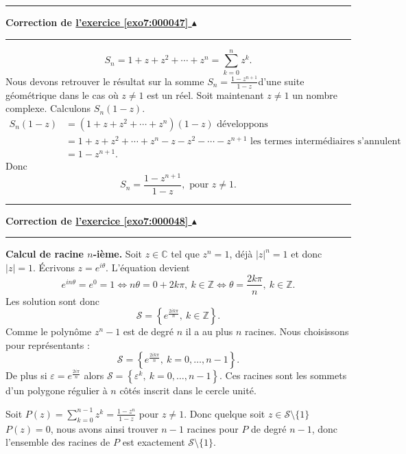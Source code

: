 \documentclass[11pt,a4paper]{article}
\newcommand{\Zz}{\mathbb{Z}} \newcommand{\Z}{\mathbb{Z}}
\newcommand{\Cc}{\mathbb{C}} \newcommand{\C}{\mathbb{C}}
\renewcommand{\epsilon}{\varepsilon}
\newcounter{exo}
\newcommand{\correction}[1]{\hypertarget{cor7:#1}{}\label{cor7:#1}{\bf Correction de \hyperlink{exo7:#1}{l'exercice \ref{exo7:#1} $\blacktriangle$}}\vspace{1mm}\hrule\vspace{1mm}}
\newcommand{\fincorrection}{\vspace{1mm}\hrule\vspace*{7mm}}
\begin{document}
\fincorrection
\correction{000047}
$$S_n = 1+z+z^2+\cdots+z^n = \sum_{k=0}^{n}z^k.$$
Nous devons retrouver le r\'esultat sur la somme $S_n =
\frac{1-z^{n+1}}{1-z}$d'une suite g\'eom\'etrique dans le cas o\`u
$z\not=1$ est un r\'eel. Soit maintenant $z \not= 1$ un nombre
complexe. Calculons $S_n(1-z)$.
\begin{align*}
S_n(1-z) & =(1+z+z^2+\cdots+z^n)(1-z) \text{ d\'eveloppons }\\
         &= 1+z+z^2+\cdots+z^n - z-z^2-\cdots-z^{n+1} \text{ les termes interm\'ediaires s'annulent }\\
         &= 1-z^{n+1}.
\end{align*}
Donc $$S_n = \frac{1-z^{n+1}}{1-z}, \text{ pour } z\not= 1.$$
\fincorrection
\correction{000048}
\textbf{Calcul de racine $n$-i\`eme.} Soit $z\in\Cc$ tel que
$z^n=1$, d\'ej\`a $|z|^n=1$ et donc $|z|=1$. \'Ecrivons $z =
e^{i\theta}$. L'\'equation devient
$$e^{in\theta} = e^{0} =1
\Leftrightarrow n\theta = 0 + 2k\pi, \ k\in \Zz \Leftrightarrow \theta =
\frac{2k\pi}{n}, \ k\in \Zz.$$ Les solution sont donc
$$\mathcal{S} = \left\lbrace e^{\frac{2ik\pi}{n}}, \ k\in \Zz\right\rbrace.$$
Comme le polyn\^ome $z^n-1$ est de degr\'e $n$ il a au plus $n$
racines. Nous choisissons pour repr\'esentants :
$$\mathcal{S} = \left\lbrace e^{\frac{2ik\pi}{n}}, \ k= 0,\ldots,n-1\right\rbrace.$$
De plus si $\epsilon = e^{\frac{2i\pi}{n}}$ alors $\mathcal{S} =
\left\lbrace \epsilon^k, \ k= 0,\ldots,n-1\right\rbrace.$ Ces
racines sont les sommets d'un polygone r\'egulier \`a $n$
c\^ot\'es inscrit dans le cercle unit\'e.



Soit $P(z) = \sum_{k=0}^{n-1}z^k=\frac{1-z^{n}}{1-z}$ pour
$z\not=1$. Donc quelque soit $z\in\mathcal{S}\setminus\{ 1 \}$
$P(z) = 0$, nous avons ainsi trouver $n-1$ racines pour $P$ de
degr\'e $n-1$, donc l'ensemble des racines de $P$ est exactement
$\mathcal{S}\setminus\{ 1 \}$.
\end{document}
